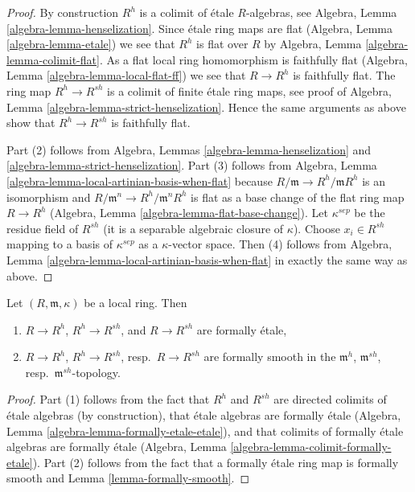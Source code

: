 \begin{proof}
By construction $R^h$ is a colimit of \'etale $R$-algebras, see
Algebra, Lemma \ref{algebra-lemma-henselization}. Since \'etale
ring maps are flat (Algebra, Lemma \ref{algebra-lemma-etale}) we see that
$R^h$ is flat over $R$ by
Algebra, Lemma \ref{algebra-lemma-colimit-flat}.
As a flat local ring homomorphism is faithfully flat
(Algebra, Lemma \ref{algebra-lemma-local-flat-ff})
we see that $R \to R^h$ is faithfully flat.
The ring map $R^h \to R^{sh}$ is a colimit of finite \'etale ring
maps, see proof of Algebra, Lemma \ref{algebra-lemma-strict-henselization}.
Hence the same arguments as above show that $R^h \to R^{sh}$ is
faithfully flat.

\medskip\noindent
Part (2) follows from Algebra, Lemmas \ref{algebra-lemma-henselization} and
\ref{algebra-lemma-strict-henselization}. Part (3) follows from
Algebra, Lemma \ref{algebra-lemma-local-artinian-basis-when-flat}
because $R/\mathfrak m \to R^h/\mathfrak mR^h$ is an isomorphism and
$R/\mathfrak m^n \to R^h/\mathfrak m^nR^h$ is flat as a base change of
the flat ring map $R \to R^h$
(Algebra, Lemma \ref{algebra-lemma-flat-base-change}).
Let $\kappa^{sep}$ be the residue field of $R^{sh}$ (it is a
separable algebraic closure of $\kappa$). Choose $x_i \in R^{sh}$
mapping to a basis of $\kappa^{sep}$ as a $\kappa$-vector space.
Then (4) follows from
Algebra, Lemma \ref{algebra-lemma-local-artinian-basis-when-flat}
in exactly the same way as above.
\end{proof}

\begin{lemma}
\label{lemma-henselization-formally-smooth}
Let $(R, \mathfrak m, \kappa)$ be a local ring. Then
\begin{enumerate}
\item $R \to R^h$, $R^h \to R^{sh}$, and $R \to R^{sh}$ are formally \'etale,
\item $R \to R^h$, $R^h \to R^{sh}$, resp.\ $R \to R^{sh}$ are formally
smooth in the $\mathfrak m^h$, $\mathfrak m^{sh}$,
resp.\ $\mathfrak m^{sh}$-topology.
\end{enumerate}
\end{lemma}

\begin{proof}
Part (1) follows from the fact that $R^h$ and $R^{sh}$ are directed
colimits of \'etale algebras (by construction), that \'etale algebras
are formally \'etale
(Algebra, Lemma \ref{algebra-lemma-formally-etale-etale}),
and that colimits of formally \'etale algebras are formally \'etale
(Algebra, Lemma \ref{algebra-lemma-colimit-formally-etale}).
Part (2) follows from the fact that a formally \'etale ring
map is formally smooth and Lemma \ref{lemma-formally-smooth}.
\end{proof}

